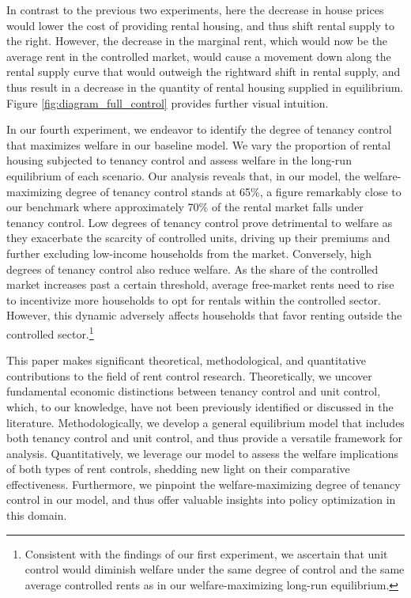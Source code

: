 \documentclass[parskip=full]{article}
\begin{document}
In contrast to the previous two experiments, here the decrease in house prices would lower the cost of providing rental housing, and thus shift rental supply to the right. However, the decrease in the marginal rent, which would now be the average rent in the controlled market, would cause a movement down along the rental supply curve that would outweigh the rightward shift in rental supply, and thus result in a decrease in the quantity of rental housing supplied in equilibrium. Figure \ref{fig:diagram_full_control} provides further visual intuition.

In our fourth experiment, we endeavor to identify the degree of tenancy control that maximizes welfare in our baseline model. We vary the proportion of rental housing subjected to tenancy control and assess welfare in the long-run equilibrium of each scenario. Our analysis reveals that, in our model, the welfare-maximizing degree of tenancy control stands at 65\%, a figure remarkably close to our benchmark where approximately 70\% of the rental market falls under tenancy control. Low degrees of tenancy control prove detrimental to welfare as they exacerbate the scarcity of controlled units, driving up their premiums and further excluding low-income households from the market. Conversely, high degrees of tenancy control also reduce welfare. As the share of the controlled market increases past a certain threshold, average free-market rents need to rise to incentivize more households to opt for rentals within the controlled sector. However, this dynamic adversely affects households that favor renting outside the controlled sector.\footnote{Consistent with the findings of our first experiment, we ascertain that unit control would diminish welfare under the same degree of control and the same average controlled rents as in our welfare-maximizing long-run equilibrium.}

This paper makes significant theoretical, methodological, and quantitative contributions to the field of rent control research. Theoretically, we uncover fundamental economic distinctions between tenancy control and unit control, which, to our knowledge, have not been previously identified or discussed in the literature. Methodologically, we develop a general equilibrium model that includes both tenancy control and unit control, and thus provide a versatile framework for analysis. Quantitatively, we leverage our model to assess the welfare implications of both types of rent controls, shedding new light on their comparative effectiveness. Furthermore, we pinpoint the welfare-maximizing degree of tenancy control in our model, and thus offer valuable insights into policy optimization in this domain.
\end{document}
